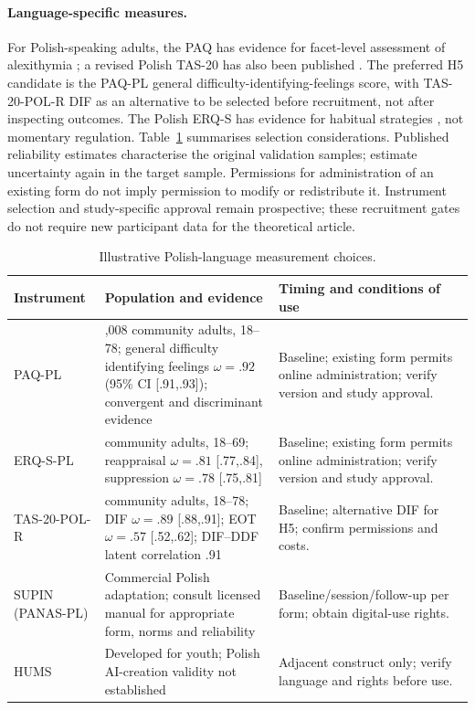 \paragraph{Language-specific measures.} For Polish-speaking adults, the PAQ has evidence for facet-level assessment of alexithymia \citep{paqpl2022}; a revised Polish TAS-20 has also been published \citep{taspl2026}. The preferred H5 candidate is the PAQ-PL general difficulty-identifying-feelings score, with TAS-20-POL-R DIF as an alternative to be selected before recruitment, not after inspecting outcomes. The Polish ERQ-S has evidence for habitual strategies \citep{erqspl2024}, not momentary regulation. Table~\ref{tab:language} summarises selection considerations. Published reliability estimates characterise the original validation samples; estimate uncertainty again in the target sample. Permissions for administration of an existing form do not imply permission to modify or redistribute it. Instrument selection and study-specific approval remain prospective; these recruitment gates do not require new participant data for the theoretical article.

\begin{table}[htbp]
\centering\small
\caption{Illustrative Polish-language measurement choices.}
\label{tab:language}
\begin{tabularx}{\linewidth}{@{}>{\raggedright\arraybackslash}p{.23\linewidth}>{\raggedright\arraybackslash}p{.30\linewidth}>{\raggedright\arraybackslash}X@{}}
\toprule
Instrument & Population and evidence & Timing and conditions of use \\
\midrule
PAQ-PL & 1,008 community adults, 18--78; general difficulty identifying feelings $\omega=.92$ (95\% CI [.91,.93]); convergent and discriminant evidence & Baseline; existing form permits online administration; verify version and study approval. \\
ERQ-S-PL & 574 community adults, 18--69; reappraisal $\omega=.81$ [.77,.84], suppression $\omega=.78$ [.75,.81] & Baseline; existing form permits online administration; verify version and study approval. \\
TAS-20-\allowbreak POL-R & 591 community adults, 18--78; DIF $\omega=.89$ [.88,.91]; EOT $\omega=.57$ [.52,.62]; DIF--DDF latent correlation .91 & Baseline; alternative DIF for H5; confirm permissions and costs. \\
SUPIN (PANAS-PL) & Commercial Polish adaptation; consult licensed manual for appropriate form, norms and reliability & Baseline/session/follow-up per form; obtain digital-use rights. \\
HUMS & Developed for youth; Polish AI-creation validity not established & Adjacent construct only; verify language and rights before use. \\
\bottomrule
\end{tabularx}
\end{table}
